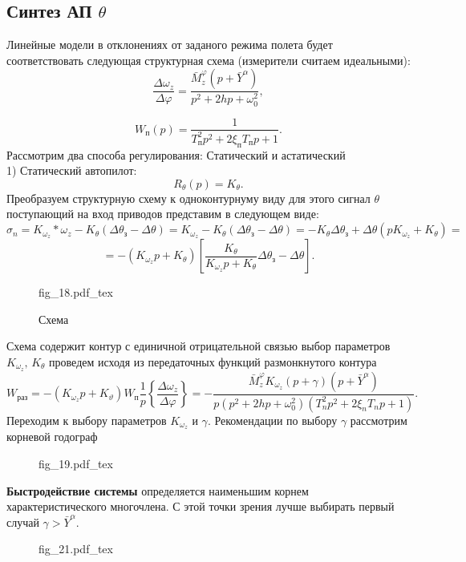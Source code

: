 \documentclass{article}
\begin{document}
\subsection{Синтез АП $\theta$}
Линейные модели в отклонениях от заданого режима полета будет соответствовать следующая структурная схема (измерители считаем идеальными):
\[
\frac{\Delta \omega_z}{\Delta \varphi} = \frac{\bar{M}_z^\varphi (p+\bar{Y}^\alpha)}{p^2 + 2hp + \omega_{0}^2},
\]

\[
W_п(p) = \frac{1}{T_п^2 p^2 + 2 \xi_п T_п p + 1}.
\]
Рассмотрим два способа регулирования: 
Статический и астатический\\
1) Статический автопилот: 
\[
R_{\theta}(p)= K_\theta.
\]
Преобразуем структурную схему к одноконтурнуму виду для этого сигнал $\theta$ поступающий на вход приводов представим в следующем виде: 
\[
\sigma_n = K_{\omega_z}*\omega_z - K_\theta (\Delta \theta_з - \Delta \theta) = K_{\omega_z} - K_{\theta}(\Delta \theta_з - \Delta \theta) = -K_{\theta} \Delta \theta_з + \Delta \theta(p K_{\omega_z} + K_{\theta}) =
\]
\[
= -(K_{\omega_z}p + K_\theta)[\frac{K_\theta}{K_{\omega_z}p + K_{\theta}}\Delta\theta_з - \Delta \theta].
\]
\begin{figure}[h]
\centering
{fig_18.pdf_tex}
\caption{Схема}
\label{fig:18}
\end{figure}

Схема содержит контур с единичной отрицательной связью выбор параметров $K_{\omega_z}, \, K_{\theta}$ проведем исходя из передаточных функций размонкнутого контура
\[
W_{раз} = -(K_{\omega_z} p + K_\vartheta) W_п \frac{1}{p}\left\{{\frac{\Delta \omega_z}{\Delta \varphi}}\right\} = -\frac{\bar{M}_z^\varphi K_{\omega_{z}}(p + \gamma)(p + \bar{Y}^\alpha)}{p(p^2 + 2hp + \omega_0^2)(T_n^2 p^2 + 2 \xi_n T_n p +1)}.
\]
Переходим к выбору параметров $K_{\omega_z}$ и $\gamma$.
Рекомендации по выбору $\gamma$ рассмотрим корневой годограф 

\begin{figure}[H]
\centering
{fig_19.pdf_tex}
\end{figure}

\textbf{Быстродействие системы} определяется наименьшим корнем характеристического многочлена.
С этой точки зрения лучше выбирать первый случай $\gamma > \bar{Y}^\alpha$.\\

\begin{figure}[H]
\centering
{fig_21.pdf_tex}
\end{figure}
\end{document}

